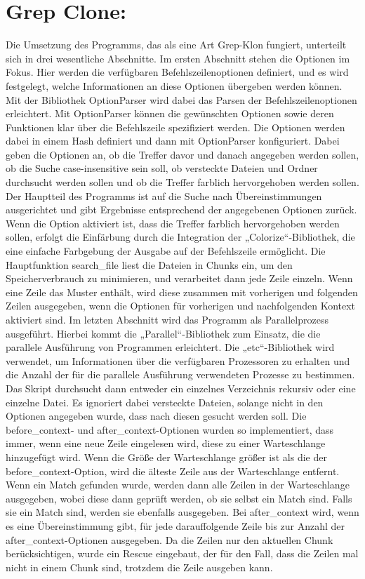 \documentclass{article}
\begin{document}
\section*{Grep Clone:}
Die Umsetzung des Programms, das als eine Art Grep-Klon fungiert, unterteilt sich in drei wesentliche Abschnitte. Im ersten Abschnitt stehen die Optionen im Fokus. Hier werden die verfügbaren Befehlszeilenoptionen definiert, und es wird festgelegt, welche Informationen an diese Optionen übergeben werden können. Mit der Bibliothek OptionParser wird dabei das Parsen der Befehlszeilenoptionen erleichtert. Mit OptionParser können die gewünschten Optionen sowie deren Funktionen klar über die Befehlszeile spezifiziert werden. Die Optionen werden dabei in einem Hash definiert und dann mit OptionParser konfiguriert. Dabei geben die Optionen an, ob die Treffer davor und danach angegeben werden sollen, ob die Suche case-insensitive sein soll, ob versteckte Dateien und Ordner durchsucht werden sollen und ob die Treffer farblich hervorgehoben werden sollen.
Der Hauptteil des Programms ist auf die Suche nach Übereinstimmungen ausgerichtet und gibt Ergebnisse entsprechend der angegebenen Optionen zurück. Wenn die Option aktiviert ist, dass die Treffer farblich hervorgehoben werden sollen, erfolgt die Einfärbung durch die Integration der „Colorize“-Bibliothek, die eine einfache Farbgebung der Ausgabe auf der Befehlszeile ermöglicht.
Die Hauptfunktion search\_file liest die Dateien in Chunks ein, um den Speicherverbrauch zu minimieren, und verarbeitet dann jede Zeile einzeln. Wenn eine Zeile das Muster enthält, wird diese zusammen mit vorherigen und folgenden Zeilen ausgegeben, wenn die Optionen für vorherigen und nachfolgenden Kontext aktiviert sind.
Im letzten Abschnitt wird das Programm als Parallelprozess ausgeführt. Hierbei kommt die „Parallel“-Bibliothek zum Einsatz, die die parallele Ausführung von Programmen erleichtert. Die „etc“-Bibliothek wird verwendet, um Informationen über die verfügbaren Prozessoren zu erhalten und die Anzahl der für die parallele Ausführung verwendeten Prozesse zu bestimmen.
Das Skript durchsucht dann entweder ein einzelnes Verzeichnis rekursiv oder eine einzelne Datei. Es ignoriert dabei versteckte Dateien, solange nicht in den Optionen angegeben wurde, dass nach diesen gesucht werden soll.
Die before\_context- und after\_context-Optionen wurden so implementiert, dass immer, wenn eine neue Zeile eingelesen wird, diese zu einer Warteschlange hinzugefügt wird. Wenn die Größe der Warteschlange größer ist als die der before\_context-Option, wird die älteste Zeile aus der Warteschlange entfernt. Wenn ein Match gefunden wurde, werden dann alle Zeilen in der Warteschlange ausgegeben, wobei diese dann geprüft werden, ob sie selbst ein Match sind. Falls sie ein Match sind, werden sie ebenfalls ausgegeben. Bei after\_context wird, wenn es eine Übereinstimmung gibt, für jede darauffolgende Zeile bis zur Anzahl der after\_context-Optionen ausgegeben. Da die Zeilen nur den aktuellen Chunk berücksichtigen, wurde ein Rescue eingebaut, der für den Fall, dass die Zeilen mal nicht in einem Chunk sind, trotzdem die Zeile ausgeben kann.
\end{document}
